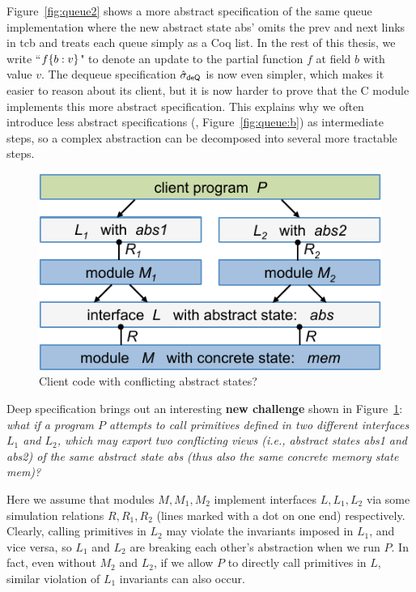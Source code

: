 Figure~\ref{fig:queue2} shows a more abstract specification of the same
queue implementation where the new abstract state \textsf{abs'} omits
the \textsf{prev} and \textsf{next} links in \textsf{tcb} and treats each
queue simply as a Coq list. 
In the rest of this thesis, we write ``$f\{b:v\}$"
to denote an update to the partial function $f$ at field $b$ 
with value $v$.
The dequeue specification 
$\hat{\sigma}_\textsf{deQ}$ is now
even simpler, which makes it easier to reason about its client,
but it is now harder to prove that the C module
implements this more abstract specification.  This explains why we
often introduce less abstract specifications (\eg,
Figure~\ref{fig:queue:b}) as intermediate steps, so a
complex abstraction can be decomposed into several more tractable steps.


\begin{figure}[t]\centering
\includegraphics[scale=1]{figs/conflict}
\caption{Client code with conflicting abstract states?}
\hrulefill
\label{fig:conflict}
\end{figure}

Deep specification brings out an interesting {\bf new challenge}
shown in Figure~\ref{fig:conflict}: {\em what if a program $P$ attempts to
call primitives defined in two different interfaces $L_1$ and $L_2$,
which may export two conflicting views (i.e., abstract states
\textsf{abs1} and \textsf{abs2}) of the same abstract state \textsf{abs}
(thus also the same concrete memory state \textsf{mem})?}

Here we assume that modules $M, M_1, M_2$ implement interfaces $L,
L_1, L_2$ via some simulation relations $R, R_1, R_2$ (lines marked
with a dot on one end) respectively. Clearly, calling primitives in
$L_2$ may violate the invariants imposed in $L_1$, and vice versa,
so $L_1$ and $L_2$ are breaking each other's abstraction when we run
$P$. In fact, even without $M_2$ and $L_2$, if we allow $P$ to
directly call primitives in $L$, similar violation of $L_1$ invariants
can also occur.


